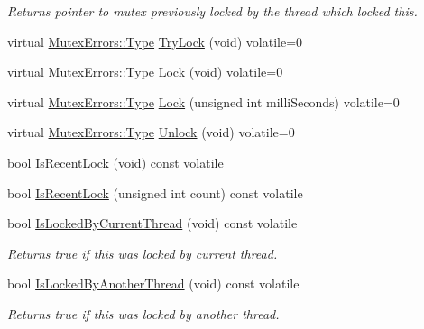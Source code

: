 \begin{DoxyCompactItemize}
\begin{DoxyCompactList}\small\item\em Returns pointer to mutex previously locked by the thread which locked this. \end{DoxyCompactList}\item 
virtual \hyperlink{classLoki_1_1MutexErrors_acd0eb6065ca303083d2e0229d7bff590}{Mutex\+Errors\+::\+Type} \hyperlink{classLoki_1_1LevelMutexInfo_a32f89bf087b932de0cdd1151116779b4}{Try\+Lock} (void) volatile=0
\item 
virtual \hyperlink{classLoki_1_1MutexErrors_acd0eb6065ca303083d2e0229d7bff590}{Mutex\+Errors\+::\+Type} \hyperlink{classLoki_1_1LevelMutexInfo_ac0e21e08ee9974533a4da5008452bd04}{Lock} (void) volatile=0
\item 
virtual \hyperlink{classLoki_1_1MutexErrors_acd0eb6065ca303083d2e0229d7bff590}{Mutex\+Errors\+::\+Type} \hyperlink{classLoki_1_1LevelMutexInfo_a5782b9fd9734d95a38ff86ef9532c89b}{Lock} (unsigned int milli\+Seconds) volatile=0
\item 
virtual \hyperlink{classLoki_1_1MutexErrors_acd0eb6065ca303083d2e0229d7bff590}{Mutex\+Errors\+::\+Type} \hyperlink{classLoki_1_1LevelMutexInfo_a01c9af5cb0f6870585b864b4557e9242}{Unlock} (void) volatile=0
\item 
bool \hyperlink{classLoki_1_1LevelMutexInfo_ae2dd128d5864ad0ffe9fa55912e11c5c}{Is\+Recent\+Lock} (void) const  volatile
\item 
bool \hyperlink{classLoki_1_1LevelMutexInfo_acf885ea3edb574c902e61a9a97cd4933}{Is\+Recent\+Lock} (unsigned int count) const  volatile
\item 
\hypertarget{classLoki_1_1LevelMutexInfo_a9bc33a319dd0aab4df4d95a557eeda0f}{}bool \hyperlink{classLoki_1_1LevelMutexInfo_a9bc33a319dd0aab4df4d95a557eeda0f}{Is\+Locked\+By\+Current\+Thread} (void) const  volatile\label{classLoki_1_1LevelMutexInfo_a9bc33a319dd0aab4df4d95a557eeda0f}

\begin{DoxyCompactList}\small\item\em Returns true if this was locked by current thread. \end{DoxyCompactList}\item 
\hypertarget{classLoki_1_1LevelMutexInfo_a3c0f3e952926fca76d2921b47d3b9457}{}bool \hyperlink{classLoki_1_1LevelMutexInfo_a3c0f3e952926fca76d2921b47d3b9457}{Is\+Locked\+By\+Another\+Thread} (void) const  volatile\label{classLoki_1_1LevelMutexInfo_a3c0f3e952926fca76d2921b47d3b9457}

\begin{DoxyCompactList}\small\item\em Returns true if this was locked by another thread. \end{DoxyCompactList}\end{DoxyCompactItemize}
